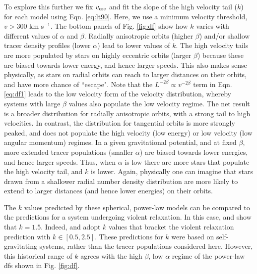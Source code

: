 \documentclass[fleqn,usenatbib]{mnras}
\begin{document}
To explore this further we fix $v_{\rm esc}$ and fit the slope of the high velocity tail ($k$) for each model using Eqn. \ref{eq:lt90}. Here, we use a minimum velocity threshold, $v > 300$ km s$^{-1}$. The bottom panels of Fig. \ref{fig:df} show how $k$ varies with different values of $\alpha$ and $\beta$. Radially anisotropic orbits (higher $\beta$) and/or shallow tracer density profiles (lower $\alpha$) lead to lower values of $k$. The high velocity tails are more populated by stars on highly eccentric orbits (larger $\beta$) because these are biased towards lower energy, and hence larger speeds. This also makes sense physically, as stars on radial orbits can reach to larger distances on their orbits, and have more chance of ``escape". Note that the $L^{-2\beta} \propto v^{-2\beta}$ term in Eqn. \ref{eq:df1} leads to the low velocity form of the velocity distribution, whereby systems with large $\beta$ values also populate the low velocity regime. The net result is a broader distribution for radially anisotropic orbits,  with a strong tail to high velocities. In contrast, the distribution for tangential orbits is more strongly peaked, and does not populate the high velocity (low energy) or low velocity (low angular momentum) regimes.
 In a given gravitational potential, and at fixed $\beta$, more extended tracer populations (smaller $\alpha$) are biased towards lower energies, and hence larger speeds. Thus, when $\alpha$ is low there are more stars that populate the high velocity tail, and $k$ is lower. Again, physically one can imagine that stars drawn from a shallower radial number density distribution are more likely to extend to larger distances (and hence lower energies) on their orbits. 
 
The $k$ values predicted by these spherical, power-law models can be compared to the predictions for a system undergoing violent relaxation. In this case, \cite{jaffe87} and  \cite{tremaine87} show that $k =1.5$. Indeed, \cite{lt90} and \cite{kochanek96} adopt $k$ values that bracket the violent relaxation prediction with $k \in [0.5,2.5]$. These predictions for $k$ were based on self-gravitating systems, rather than the tracer populations considered here. However, this historical range of $k$ agrees with the high $\beta$, low $\alpha$ regime of the power-law dfs shown in Fig. \ref{fig:df}.
\end{document}
